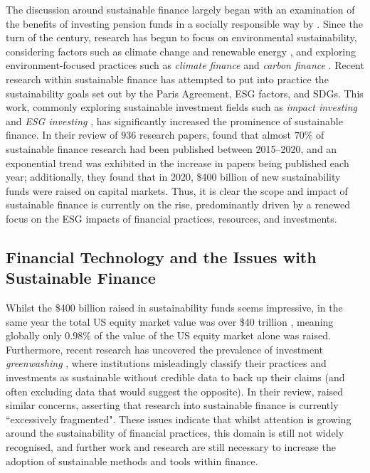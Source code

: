 \documentclass[a4paper, 11pt]{report}
\begin{document}
    The discussion around sustainable finance largely began with an examination of the benefits of investing pension funds in a socially responsible way by \citeauthor{ferris-1986}. Since the turn of the century, research has begun to focus on environmental sustainability, considering factors such as climate change and renewable energy \citep{laan-2004}, and exploring environment-focused practices such as \emph{climate finance} \citep{hogarth-2012} and \emph{carbon finance} \citep{aglietta-2015}. Recent research within sustainable finance has attempted to put into practice the sustainability goals set out by the Paris Agreement, ESG factors, and SDGs. This work, commonly exploring sustainable investment fields such as \emph{impact investing} \citep{agrawal-2021} and \emph{ESG investing} \citep{alessandrini-2020}, has significantly increased the prominence of sustainable finance. In their review of $936$ research papers, \citet{kumar-2022} found that almost $70\%$ of sustainable finance research had been published between 2015--2020, and an exponential trend was exhibited in the increase in papers being published each year; additionally, they found that in 2020, \$400 billion of new sustainability funds were raised on capital markets. Thus, it is clear the scope and impact of sustainable finance is currently on the rise, predominantly driven by a renewed focus on the ESG impacts of financial practices, resources, and investments.


    \subsection{Financial Technology and the Issues with Sustainable Finance}

    Whilst the \$400 billion raised in sustainability funds seems impressive, in the same year the total US equity market value was over \$40 trillion \citep{siblis-2022}, meaning globally only $0.98\%$ of the value of the US equity market alone was raised. Furthermore, recent research has uncovered the prevalence of investment \emph{greenwashing} \citep{popescu-2021}, where institutions misleadingly classify their practices and investments as sustainable without credible data to back up their claims (and often excluding data that would suggest the opposite). In their review, \citet{cunha-2021} raised similar concerns, asserting that research into sustainable finance is currently ``excessively fragmented". These issues indicate that whilst attention is growing around the sustainability of financial practices, this domain is still not widely recognised, and further work and research are still necessary to increase the adoption of sustainable methods and tools within finance. 
\end{document}
